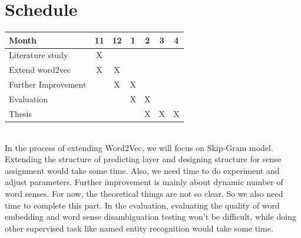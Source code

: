 \documentclass{scrartcl}
\begin{document}
\section{Schedule}

\begin{tabular}{|l||c|c|c|c|c|c|}
\hline
\textbf{Month} & \textbf{11} & \textbf{12} & \textbf{1} & \textbf{2} & \textbf{3} & \textbf{4} \\
\hline
\hline
Literature study & X & & & & & \\
Extend word2vec & X & X & & & & \\
Further Improvement & & X & X & & & \\
Evaluation & & & X & X & & \\
Thesis & & & & X & X & X \\
\hline
\end{tabular}

\hfill \\

In the process of extending Word2Vec, we will focus on Skip-Gram model. Extending the structure of predicting layer and designing structure for sense assignment would take some time. Also, we need time to do experiment and adjust parameters. Further improvement is mainly about dynamic number of word senses. For now, the theoretical things are not so clear. So we also need time to complete this part. In the evaluation, evaluating the quality of word embedding and word sense disambiguation testing won't be difficult, while doing other supervised task like named entity recognition would take some time.
\hfill \\
\hfill \\
\hfill \\
\hfill \\
\hfill \\
\hfill \\



\end{document}

